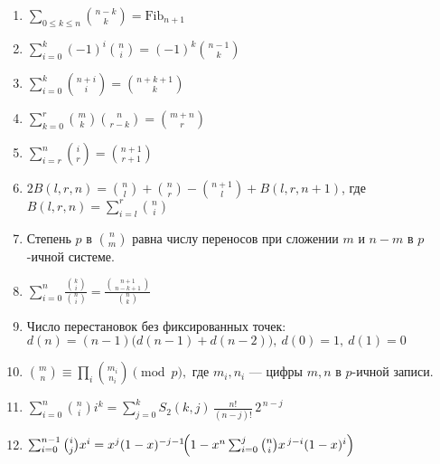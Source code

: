 
\begingroup
\small

\begin{enumerate}
\item %
$\sum_{0\le k\le n}\binom{n-k}{k}=\mathrm{Fib}_{n+1}$

\item %
$\sum_{i=0}^{k}(-1)^i\binom{n}{i}=(-1)^k\binom{n-1}{k}$

\item %
$\sum_{i=0}^{k}\binom{n+i}{i}=\binom{n+k+1}{k}$

\item %
$\sum_{k=0}^{r}\binom{m}{k}\binom{n}{r-k}=\binom{m+n}{r}$

\item %
$\sum_{i=r}^{n}\binom{i}{r}=\binom{n+1}{r+1}$

\item %
$2B(l,r,n) = \binom{n}{l} + \binom{n}{r} - \binom{n+1}{l} + B(l, r, n+1)$, где $B(l, r, n) = \sum_{i=l}^r \binom{n}{i}$

\item %
Степень $p$ в $\binom{n}{m}$ равна числу переносов при сложении $m$ и $n-m$ в $p$-ичной системе.

\item %
$\sum_{i=0}^{n}\frac{\binom{k}{i}}{\binom{n}{i}}
=\frac{\binom{n+1}{\,n-k+1\,}}{\binom{n}{k}}$

\item %
Число перестановок без фиксированных точек: \\ $d(n)=(n-1)\bigl(d(n-1)+d(n-2)\bigr),\  d(0)=1,\ d(1)=0$

\item %
$\binom{m}{n}\equiv\prod_i\binom{m_i}{n_i}\pmod p,$
\quad где $m_i,n_i$ — цифры $m,n$ в $p$-ичной записи.

\item %
$\sum_{i=0}^{n}\binom{n}{i}i^k
=\sum_{j=0}^{k}S_2(k,j)\,\frac{n!}{(n-j)!}\,2^{\,n-j}$

\item %
$\sum_{i=0}^{n-1}\binom{i}{j}x^i
= x^j(1-x)^{-j-1}\!\Bigl(1-x^n\sum_{i=0}^j\binom{n}{i}x^{\,j-i}(1-x)^i\Bigr)$


\end{enumerate}
